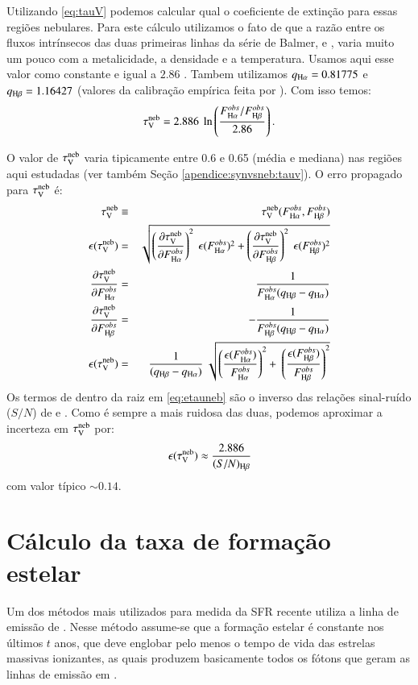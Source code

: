 Utilizando \eqref{eq:tauV} podemos calcular qual o coeficiente de extinção para essas regiões nebulares. Para este cálculo utilizamos o fato de que a razão entre os fluxos intrínsecos das duas primeiras linhas da série de Balmer, \Ha e \Hb, varia muito um pouco com a metalicidade, a densidade e a temperatura. Usamos aqui esse valor como constante e igual a $2.86$ \citep[densidade eletrônica de $n = 100\ cm^{-3}$ e temperatura eletrônica $T_e = 10^4$ K; ][]{Osterbrock.Ferland.2006a}. Tambem utilizamos $q_{\Ha}  = 0.81775$ e $q_{\Hb} = 1.16427$ (valores da calibração empírica feita por \citeauthor{CCM1989a}). Com isso temos:
\begin{equation}
	\tauVN = 2.886\ \ln \left( \frac{F_{\Ha}^{obs}/F_{\Hb}^{obs}}{2.86} \right).
\end{equation}

O valor de $\tau_{\mathrm{V}}^{\mathrm{neb}}$ varia tipicamente entre 0.6 e 0.65 (média e mediana) nas regiões aqui estudadas (ver também Seção \ref{apendice:synvsneb:tauv}).
O erro propagado para $\tau_{\mathrm{V}}^{\mathrm{neb}}$ é:
\begin{eqnarray}
	\tauVN &\equiv& \tauVN(F_{\Ha}^{obs}, F_{\Hb}^{obs}) \\
	\epsilon (\tauVN) &=& \sqrt{\left(\del{\tauVN}{F_{\Ha}^{obs}}\right)^2 \
\epsilon (F_{\Ha}^{obs})^2 + \left(\del{\tauVN}{F_{\Hb}^{obs}}\right)^2 \
\epsilon (F_{\Hb}^{obs})^2 } \\
	\del{\tauVN}{F_{\Ha}^{obs}} &=& \frac{1}{F_{\Ha}^{obs} (q_{\Hb} - q_{\Ha})} \\
	\del{\tauVN}{F_{\Hb}^{obs}} &=& - \frac{1}{F_{\Hb}^{obs} (q_{\Hb} - q_{\Ha})} \\
	\epsilon (\tauVN) &=& \frac{1}{(q_{\Hb} - q_{\Ha})} \
\sqrt{\left(\frac{\epsilon (F_{\Ha}^{obs})}{F_{\Ha}^{obs}}\right)^2 + \
\left(\frac{\epsilon (F_{\Hb}^{obs})}{F_{\Hb}^{obs}}\right)^2 }
	\label{eq:etauneb}
\end{eqnarray}
\noindent Os termos de dentro da raiz em \eqref{eq:etauneb} são o inverso das relações sinal-ruído ($S/N$) de \Ha e \Hb. Como \Hb é sempre a mais ruidosa das duas, podemos aproximar a incerteza em $\tau_{\mathrm{V}}^{\mathrm{neb}}$ por:
\begin{equation}
	\epsilon (\tauVN) \approx \frac{2.886}{(S/N)_{\Hb}}
	\label{eq:etaunebaprox}
\end{equation}
\noindent com valor típico $\sim 0.14$.

\section{Cálculo da taxa de formação estelar}
\label{apendice:EMLprops:SFR}
Um dos métodos mais utilizados para medida da SFR recente utiliza a linha de emissão de \Ha. Nesse método assume-se que a formação estelar é constante nos últimos $t$ anos, que deve englobar pelo menos o tempo de vida das estrelas massivas ionizantes, as quais produzem basicamente todos os fótons que geram as linhas de emissão em \Ha.

